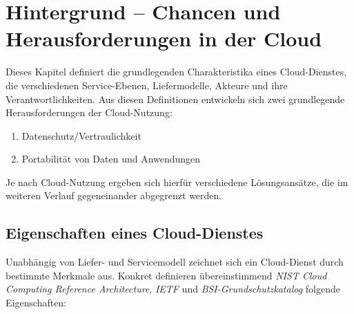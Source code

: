 \chapter{Hintergrund -- Chancen und Herausforderungen in der Cloud}

Dieses Kapitel definiert die grundlegenden Charakteristika eines Cloud-Dienstes, die verschiedenen Service-Ebenen, Liefermodelle, Akteure und ihre Verantwortlichkeiten. Aus diesen Definitionen entwickeln sich zwei grundlegende Herausforderungen der Cloud-Nutzung:

\begin{enumerate}
	\item Datenschutz/Vertraulichkeit
	\item Portabilität von Daten und Anwendungen
\end{enumerate}

Je nach Cloud-Nutzung ergeben sich hierfür verschiedene Lösungsansätze, die im weiteren Verlauf gegeneinander abgegrenzt werden.


\section{Eigenschaften eines Cloud-Dienstes}

Unabhängig von Liefer- und Servicemodell zeichnet sich ein Cloud-Dienst durch bestimmte Merkmale aus. Konkret definieren übereinstimmend \emph{NIST Cloud Computing Reference Architecture}, \emph{IETF} und \emph{BSI-Grundschutzkatalog} \cite{nist:2011:reference-architecture, ietf:2015:reference-framework, bsi:2014:grundschutz} folgende Eigenschaften:

